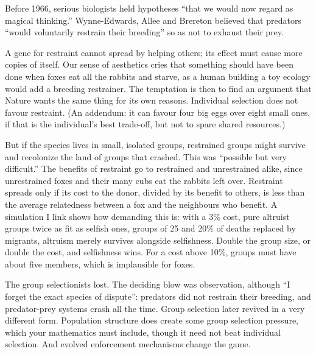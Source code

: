 
Before 1966, serious biologists held hypotheses ``that we would now regard as magical thinking.''  Wynne-Edwards, Allee and Brereton believed that predators ``would voluntarily restrain their breeding'' so as not to exhaust their prey. 

A gene for restraint cannot spread by helping others; its effect must cause more copies of itself. Our sense of aesthetics cries that something should have been done when foxes eat all the rabbits and starve, as a human building a toy ecology would add a breeding restrainer. The temptation is then to find an argument that Nature wants the same thing for its own reasons. Individual selection does not favour restraint. (An addendum: it can favour four big eggs over eight small ones, if that is the individual's best trade-off, but not to spare shared resources.)

But if the species lives in small, isolated groups, restrained groups might survive and recolonize the land of groups that crashed. This was ``possible but very difficult.'' The benefits of restraint go to restrained and unrestrained alike, since unrestrained foxes and their many cubs eat the rabbits left over. Restraint spreads only if its cost to the donor, divided by its benefit to others, is less than the average relatedness between a fox and the neighbours who benefit. A simulation I link shows how demanding this is: with a 3\% cost, pure altruist groups twice as fit as selfish ones, groups of 25 and 20\% of deaths replaced by migrants, altruism merely survives alongside selfishness. Double the group size, or double the cost, and selfishness wins. For a cost above 10\%, groups must have about five members, which is implausible for foxes.

The group selectionists lost. The deciding blow was observation, although ``I forget the exact species of dispute'': predators did not restrain their breeding, and predator-prey systems crash all the time. Group selection later revived in a very different form. Population structure does create some group selection pressure, which your mathematics must include, though it need not beat individual selection. And evolved enforcement mechanisms change the game.

